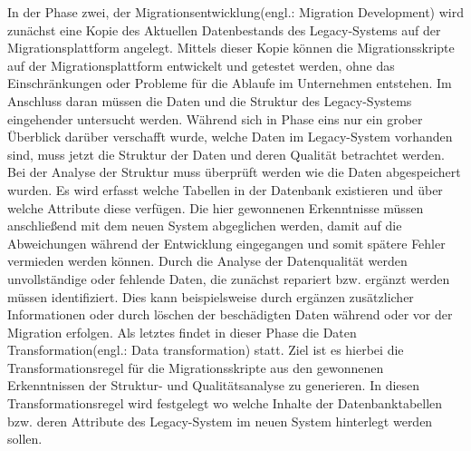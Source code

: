 In der Phase zwei, der Migrationsentwicklung(engl.: Migration Development) wird zunächst eine Kopie des Aktuellen Datenbestands des Legacy-Systems auf der Migrationsplattform angelegt. Mittels dieser Kopie können die Migrationsskripte auf der Migrationsplattform entwickelt und getestet werden, ohne das Einschränkungen oder Probleme für die Ablaufe im Unternehmen entstehen.\citep[S. 7]{klausMatthesSchulz-2012} Im Anschluss daran müssen die Daten und die Struktur des Legacy-Systems eingehender untersucht werden. Während sich in Phase eins nur ein grober Überblick darüber verschafft wurde, welche Daten im Legacy-System vorhanden sind, muss jetzt die Struktur der Daten und deren Qualität betrachtet werden.\citep[S. 7f]{klausMatthesSchulz-2012} Bei der Analyse der Struktur muss überprüft werden wie die Daten abgespeichert wurden. Es wird erfasst welche Tabellen in der Datenbank existieren und über welche Attribute diese verfügen. Die hier gewonnenen Erkenntnisse müssen anschließend mit dem neuen System abgeglichen werden, damit auf die Abweichungen während der Entwicklung eingegangen und somit spätere Fehler vermieden werden können.\citep[S. 8]{klausMatthesSchulz-2012} Durch die Analyse der Datenqualität werden unvollständige oder fehlende Daten, die zunächst repariert bzw. ergänzt werden müssen identifiziert. Dies kann beispielsweise durch ergänzen zusätzlicher Informationen oder durch löschen der beschädigten Daten während oder vor der Migration erfolgen.\citep[S. 7f]{klausMatthesSchulz-2012} Als letztes findet in dieser Phase die Daten Transformation(engl.: Data transformation) statt. Ziel ist es hierbei die Transformationsregel für die Migrationsskripte aus den gewonnenen Erkenntnissen der Struktur- und Qualitätsanalyse zu generieren. In diesen Transformationsregel wird festgelegt wo welche Inhalte der Datenbanktabellen bzw. deren Attribute des Legacy-System im neuen System hinterlegt werden sollen.\citep[S. 8]{klausMatthesSchulz-2012}
\lb
